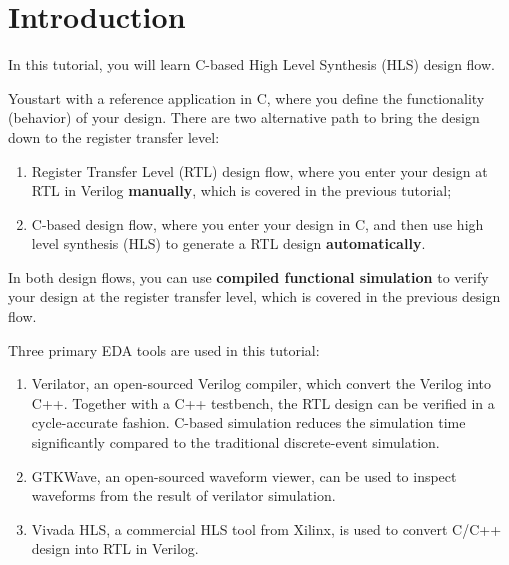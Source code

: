 \documentclass[12pt]{article}
\begin{document}
\pagebreak


\section{Introduction}

In this tutorial, you will learn C-based High Level Synthesis (HLS)
design flow.

Youstart with a reference application in C, where you define the
functionality (behavior) of your design. There are two alternative
path to bring the design down to the register transfer level:

\begin{enumerate}
\item Register Transfer Level (RTL) design flow, where you enter your
  design at RTL in Verilog {\bf manually}, which is covered in the
  previous tutorial;
  
\item C-based design flow, where you enter your design in C, and then
  use high level synthesis (HLS) to generate a RTL design {\bf
    automatically}.
\end{enumerate}

In both design flows, you can use {\bf compiled functional simulation} to
verify your design at the register transfer level, which is covered in the
previous design flow.

Three primary EDA tools are used in this tutorial:

\begin{enumerate}
\item Verilator, an open-sourced Verilog compiler, which convert the
  Verilog into C++. Together with a C++ testbench, the RTL design can
  be verified in a cycle-accurate fashion.  C-based simulation reduces
  the simulation time significantly compared to the traditional
  discrete-event simulation.

\item GTKWave, an open-sourced waveform viewer, can be used to inspect
  waveforms from the result of verilator simulation.
  
\item Vivada HLS, a commercial HLS tool from Xilinx, is used to convert
  C/C++ design into RTL in Verilog.

\end{enumerate}
\end{document}
